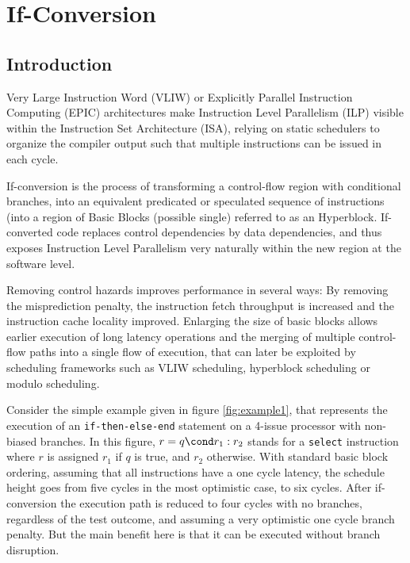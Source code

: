\chapter{If-Conversion }
\label{chapter:if_conversion}

\newcommand{\annotation}[1]{%
  \marginpar{\small\itshape\color{red}#1}}



\section{Introduction}

Very Large Instruction Word (VLIW) or Explicitly Parallel Instruction Computing (EPIC) architectures make Instruction Level Parallelism (ILP) visible within the Instruction Set Architecture (ISA), relying on static schedulers to organize the compiler output such that multiple instructions can be issued in each cycle.

If-conversion is the process of transforming a control-flow region with conditional branches, into an equivalent predicated or speculated sequence of instructions (into a region of Basic Blocks (possible single) referred to as an Hyperblock. If-converted code replaces control dependencies by data dependencies, and thus exposes Instruction Level Parallelism very naturally within the new region at the software level.

Removing control hazards improves performance in several ways: By removing the misprediction penalty, the instruction fetch throughput is increased and the instruction cache locality improved. Enlarging the size of basic blocks allows earlier execution of long latency operations and the merging of multiple control-flow paths into a single flow of execution, that can later be exploited by scheduling frameworks such as VLIW scheduling, hyperblock scheduling or modulo scheduling.

Consider the simple example given in figure \ref{fig:example1}, that represents the execution of an \texttt{if-then-else-end} statement on a 4-issue processor with non-biased branches. In this figure, $r=q\cond r_1:r_2$ stands for a \texttt{select} instruction where $r$ is assigned $r_1$ if $q$ is true, and $r_2$ otherwise. With standard basic block ordering, assuming that all instructions have a one cycle latency, the schedule height goes from five cycles in the most optimistic case, to six cycles. After if-conversion the execution path is reduced to four cycles with no branches, regardless of the test outcome, and assuming a very optimistic one cycle branch penalty. But the main benefit here is that it can be executed without branch disruption. 

